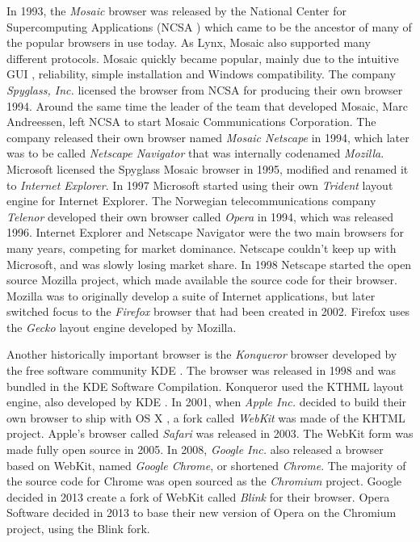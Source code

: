 \documentclass[a4paper,11pt]{kth-mag}
\newcommand\abbr[2][]{\uppercase{#2}\ifthenelse{\equal{#1}{}}%
                     {}{#1}}
\begin{document}
        In 1993, the \emph{Mosaic} browser was released by the National Center for Supercomputing Applications (\abbr{ncsa}) which came to be the ancestor of many of the popular browsers in use today.
        As Lynx, Mosaic also supported many different protocols.
        Mosaic quickly became popular, mainly due to the intuitive \abbr{gui}, reliability, simple installation and Windows compatibility.
        The company \emph{Spyglass, Inc.} licensed the browser from \abbr{ncsa} for producing their own browser 1994.
        Around the same time the leader of the team that developed Mosaic, Marc Andreessen, left \abbr{ncsa} to start Mosaic Communications Corporation.
        The company released their own browser named \emph{Mosaic Netscape} in 1994, which later was to be called \emph{Netscape Navigator} that was internally codenamed \emph{Mozilla}.
        Microsoft licensed the Spyglass Mosaic browser in 1995, modified and renamed it to \emph{Internet Explorer}.
        In 1997 Microsoft started using their own \emph{Trident} layout engine for Internet Explorer.
        The Norwegian telecommunications company \emph{Telenor} developed their own browser called \emph{Opera} in 1994, which was released 1996.
        Internet Explorer and Netscape Navigator were the two main browsers for many years, competing for market dominance.
        Netscape couldn't keep up with Microsoft, and was slowly losing market share.
        In 1998 Netscape started the open source Mozilla project, which made available the source code for their browser.
        Mozilla was to originally develop a suite of Internet applications, but later switched focus to the \emph{Firefox} browser that had been created in 2002.
        Firefox uses the \emph{Gecko} layout engine developed by Mozilla.

        Another historically important browser is the \emph{Konqueror} browser developed by the free software community \abbr{kde}.
        The browser was released in 1998 and was bundled in the \abbr{kde} Software Compilation.
        Konqueror used the \abbr{kthml} layout engine, also developed by \abbr{kde}.
        In 2001, when \emph{Apple Inc.} decided to build their own browser to ship with \abbr{os x}, a fork called \emph{WebKit} was made of the \abbr{khtml} project.
        Apple's browser called \emph{Safari} was released in 2003.
        The WebKit form was made fully open source in 2005.
        In 2008, \emph{Google Inc.} also released a browser based on WebKit, named \emph{Google Chrome}, or shortened \emph{Chrome}.
        The majority of the source code for Chrome was open sourced as the \emph{Chromium} project.
        Google decided in 2013 create a fork of WebKit called \emph{Blink} for their browser.
        Opera Software decided in 2013 to base their new version of Opera on the Chromium project, using the Blink fork.
\end{document}
